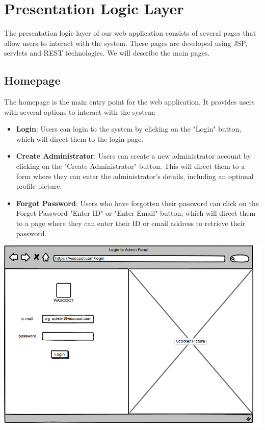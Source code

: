 \section{Presentation Logic Layer}

The presentation logic layer of our web application consists of several pages that allow users to interact with the system. These pages are developed using JSP, servlets and REST technologies.
We will describe the main pages.

\subsection{Homepage}

The homepage is the main entry point for the web application. It provides users with several options to interact with the system:

\begin{itemize}
\item \textbf{Login}: Users can login to the system by clicking on the "Login" button, which will direct them to the login page.
\item \textbf{Create Administrator}: Users can create a new administrator account by clicking on the "Create Administrator" button. This will direct them to a form where they can enter the administrator's details, including an optional profile picture.
\item \textbf{Forgot Password}: Users who have forgotten their password can click on the Forget Password "Enter ID" or "Enter Email" button, which will direct them to a page where they can enter their ID or email address to retrieve their password.
\end{itemize}

\includegraphics[scale = 0.7]{sections/DLL/login-mockup.png}

